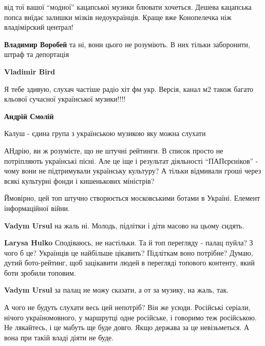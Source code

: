 \begin{itemize}
\begin{itemize}
від тої вашої \enquote{модної} кацапської музики блювати хочеться. Дешева кацапська
попса виїдає залишки мізків недоукраїнців. Краще вже Конопелечка ніж
владімірский централ!


\textbf{Владимир Воробей} та ні, вони цього не розуміють. В них тільки заборонити, штраф та депортація

\textbf{Vladimir Bird} 

Я тебе здивую, слухач частіше радіо хіт фм укр. Версія, канал м2 також багато
кльової сучасної української музики!!!!

\textbf{Андрій Смолій} 

Калуш - єдина група з українською музикою яку можна слухати

\end{itemize} %


АНдрію, ви ж розумієте, що не штучні рейтинги. В список просто не потріпляють
українські пісні. Але це іще і результат діяльності \enquote{ПАПєрєніков} - чому вони
не підтримували українську культуру? А тільки відмивали гроші через всякі
культурні фонди і кишенькових міністрів?


Ймовірно, цей топ штучно створюється московськими ботами в Україні. Елемент
інформаційної війни.

\begin{itemize} %
\textbf{Vadym Ursul} на жаль ні. Молодь, підлітки і діти масово на цьому сидять.

\textbf{Larysa Hulko} Сподіваюсь, не настільки. Та й топ перегляду - палац пуйла? З чого б це? Українців це найбільше цікавить? Підліткам воно потрібне? Думаю, дутий бото-рейтинг, щоб зацікавити людей в перегляді топового контенту, який боти зробили топовим.

\textbf{Vadym Ursul} за палац не можу сказати, а от за музику, на жаль, так.
\end{itemize} %


А чого не будуть слухати весь цей непотріб? Він же усюди. Російські серіали,
нічого україномовного, у маршрутці одне російське, і говоримо теж російською.
Не лякайтесь, і це мабуть ще буде довго. Якщо держава за це невізьметься. А
вона при такій владі діяти не буде.


\end{itemize} %
